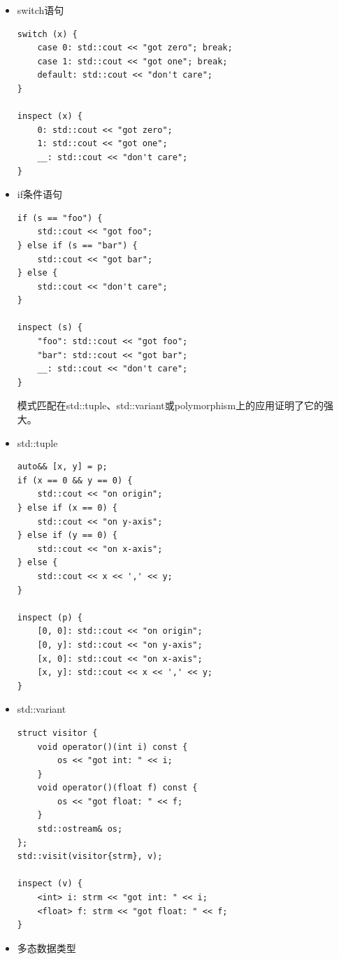 \begin{itemize}
\item 
switch语句

\begin{lstlisting}[style=styleCXX]
switch (x) {
	case 0: std::cout << "got zero"; break;
	case 1: std::cout << "got one"; break;
	default: std::cout << "don't care";
}

inspect (x) {
	0: std::cout << "got zero";
	1: std::cout << "got one";
	__: std::cout << "don't care";
}
\end{lstlisting}

\item 
if条件语句

\begin{lstlisting}[style=styleCXX]
if (s == "foo") {
	std::cout << "got foo";
} else if (s == "bar") {
	std::cout << "got bar";
} else {
	std::cout << "don't care";
}

inspect (s) {
	"foo": std::cout << "got foo";
	"bar": std::cout << "got bar";
	__: std::cout << "don't care";
}
\end{lstlisting}

模式匹配在std::tuple、std::variant或polymorphism上的应用证明了它的强大。

\item 
std::tuple

\begin{lstlisting}[style=styleCXX]
auto&& [x, y] = p;
if (x == 0 && y == 0) {
	std::cout << "on origin";
} else if (x == 0) {
	std::cout << "on y-axis";
} else if (y == 0) {
	std::cout << "on x-axis";
} else {
	std::cout << x << ',' << y;
}

inspect (p) {
	[0, 0]: std::cout << "on origin";
	[0, y]: std::cout << "on y-axis";
	[x, 0]: std::cout << "on x-axis";
	[x, y]: std::cout << x << ',' << y;
}
\end{lstlisting}

\item 
std::variant

\begin{lstlisting}[style=styleCXX]
struct visitor {
	void operator()(int i) const {
		os << "got int: " << i;
	}
	void operator()(float f) const {
		os << "got float: " << f;
	}
	std::ostream& os;
};
std::visit(visitor{strm}, v);

inspect (v) {
	<int> i: strm << "got int: " << i;
	<float> f: strm << "got float: " << f;
}
\end{lstlisting}

\item 
多态数据类型


\end{itemize}
